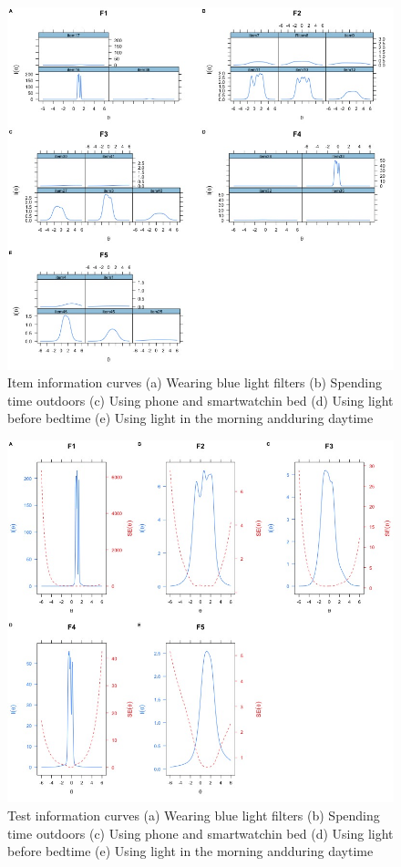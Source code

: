 \documentclass[
  english,
  man]{apa6}
\begin{document}
\begin{figure}
\includegraphics[width=1\linewidth,height=0.6\textheight]{Manuscript.figures/iteminfo} \caption{Item information curves (a) Wearing blue light filters (b) Spending time outdoors (c) Using phone and smartwatchin bed (d) Using light before bedtime (e) Using light in the morning andduring daytime}\label{fig:itmeinfo}
\end{figure}

\begin{figure}
\includegraphics[width=1\linewidth,height=0.6\textheight]{Manuscript.figures/testinfo} \caption{Test information curves (a) Wearing blue light filters (b) Spending time outdoors (c) Using phone and smartwatchin bed (d) Using light before bedtime (e) Using light in the morning andduring daytime}\label{fig:Testinfo}
\end{figure}
\end{document}
